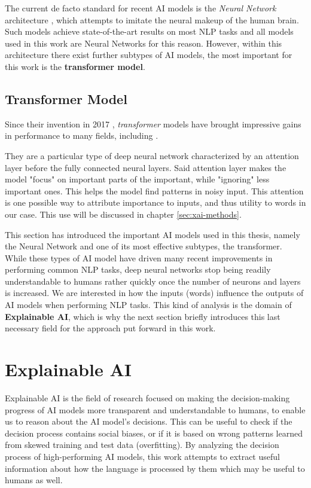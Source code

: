 The current de facto standard for recent AI models is the \textit{Neural Network} architecture , which attempts to imitate the neural makeup of the human brain.
Such models achieve state-of-the-art results on most NLP tasks  and all models used in this work are Neural Networks for this reason.
However, within this architecture there exist further subtypes of AI models, the most important for this work is the \textbf{transformer model}.


\subsection{Transformer Model} \label{sec:transformer}
Since their invention in 2017 , \textit{transformer} models have brought impressive gains in performance to many fields, including \NLP.

They are a particular type of deep neural network characterized by an attention layer before the fully connected neural layers.
Said attention layer makes the model "focus" on important parts of the important, while "ignoring" less important ones.
This helps the model find patterns in noisy input.
This attention is one possible way to attribute importance to inputs, and thus utility to words in our case.
This use will be discussed in chapter \ref{sec:xai-methods}.

This section has introduced the important AI models used in this thesis, namely the Neural Network and one of its most effective subtypes, the transformer.
While these types of AI model have driven many recent improvements in performing common NLP tasks, deep neural networks stop being readily understandable to humans rather quickly once the number of neurons and layers is increased.
We are interested in how the inputs (words) influence the outputs of AI models when performing NLP tasks.
This kind of analysis is the domain of \textbf{Explainable AI}, which is why the next section briefly introduces this last necessary field for the approach put forward in this work.

\section{Explainable AI} \label{sec:explainable-ai}
Explainable AI is the field of research focused on making the decision-making progress of AI models more transparent and understandable to humans, to enable us to reason about the AI model's decisions. 
This can be useful to check if the decision process contains social biases, or if it is based on wrong patterns learned from skewed training and test data (overfitting).
By analyzing the decision process of high-performing AI models, this work attempts to extract useful information about how the language is processed by them which may be useful to humans as well.

